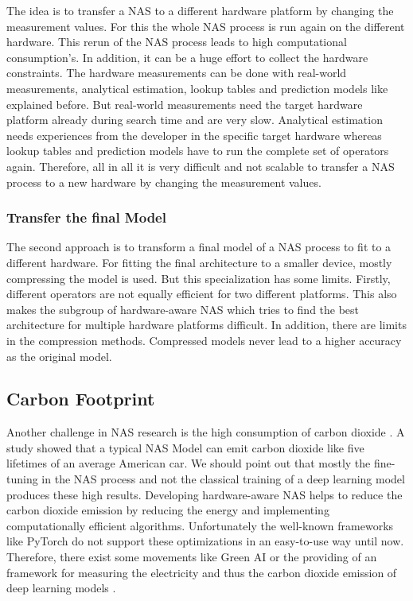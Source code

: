 \documentclass[conference]{IEEEtran}
\begin{document}
The idea is to transfer a NAS to a different hardware platform by changing the measurement values. For this the whole NAS process is run again on the different hardware. This rerun of the NAS process leads to high computational consumption's. In addition, it can be a huge effort to collect the hardware constraints. The hardware measurements can be done with real-world measurements, analytical estimation, lookup tables and prediction models like explained before. But real-world measurements need the target hardware platform already during search time and are very slow. Analytical estimation needs experiences from the developer in the specific target hardware whereas lookup tables and prediction models have to run the complete set of operators again. Therefore, all in all it is very difficult and not scalable to transfer a NAS process to a new hardware by changing the measurement values. 

\subsubsection{Transfer the final Model}

The second approach is to transform a final model of a NAS process to fit to a different hardware. For fitting the final architecture to a smaller device, mostly compressing the model is used. But this specialization has some limits. Firstly, different operators are not equally efficient for two different platforms. This also makes the subgroup of hardware-aware NAS which tries to find the best architecture for multiple hardware platforms difficult. In addition, there are limits in the compression methods. Compressed models never lead to a higher accuracy as the original model. 

\subsection{Carbon Footprint}
Another challenge in NAS research is the high consumption of carbon dioxide \cite{bib7}. A study showed that a typical NAS Model can emit carbon dioxide like five lifetimes of an average American car. We should point out that mostly the fine-tuning in the NAS process and not the classical training of a deep learning model produces these high results. Developing hardware-aware NAS helps to reduce the carbon dioxide emission by reducing the energy and implementing computationally efficient algorithms. Unfortunately the well-known frameworks like PyTorch do not support these optimizations in an easy-to-use way until now. Therefore, there exist some movements like Green AI \cite{bib8} or the providing of an framework for measuring the electricity and thus the carbon dioxide emission of deep learning models \cite{bib9}. 
\end{document}
